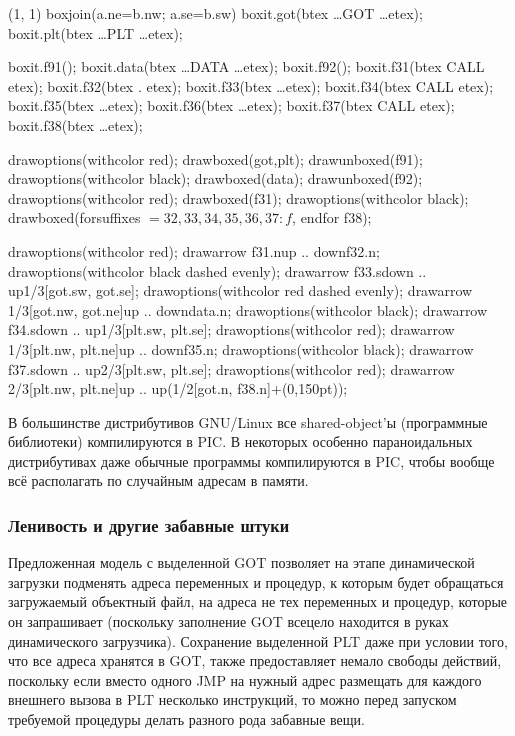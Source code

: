 \begin{empdef}[pic](1, 1)
    boxjoin(a.ne=b.nw; a.se=b.sw)
    boxit.got(btex \dots GOT \dots etex);
    boxit.plt(btex \dots PLT \dots etex);

    boxit.f91();
    boxit.data(btex \dots DATA \dots etex);
    boxit.f92();
    boxit.f31(btex CALL etex);
    boxit.f32(btex . etex);
    boxit.f33(btex \dots etex);
    boxit.f34(btex CALL etex);
    boxit.f35(btex \dots etex);
    boxit.f36(btex \dots etex);
    boxit.f37(btex CALL etex);
    boxit.f38(btex \dots etex);

    drawoptions(withcolor red);
    drawboxed(got,plt);
    drawunboxed(f91);
    drawoptions(withcolor black);
    drawboxed(data);
    drawunboxed(f92);
    drawoptions(withcolor red);
    drawboxed(f31);
    drawoptions(withcolor black);
    drawboxed(forsuffixes $=32,33,34,35,36,37: f$, endfor f38);

    drawoptions(withcolor red);
    drawarrow f31.n{up} .. {down}f32.n;
    drawoptions(withcolor black dashed evenly);
    drawarrow f33.s{down} .. {up}1/3[got.sw, got.se];
    drawoptions(withcolor red dashed evenly);
    drawarrow 1/3[got.nw, got.ne]{up} .. {down}data.n;
    drawoptions(withcolor black);
    drawarrow f34.s{down} .. {up}1/3[plt.sw, plt.se];
    drawoptions(withcolor red);
    drawarrow 1/3[plt.nw, plt.ne]{up} .. {down}f35.n;
    drawoptions(withcolor black);
    drawarrow f37.s{down} .. {up}2/3[plt.sw, plt.se];
    drawoptions(withcolor red);
    drawarrow 2/3[plt.nw, plt.ne]{up} .. {up}(1/2[got.n, f38.n]+(0,150pt));
\end{empdef}


В большинстве дистрибутивов GNU/Linux все shared-object'ы (программные библиотеки) компилируются в PIC.
В некоторых особенно параноидальных дистрибутивах даже обычные программы компилируются в PIC, чтобы вообще всё располагать по случайным адресам в памяти.

\subsubsection{Ленивость и другие забавные штуки}\label{sec:cl:linking:lazy}

Предложенная модель с выделенной GOT позволяет на этапе динамической загрузки подменять адреса переменных и процедур, к которым будет обращаться загружаемый объектный файл, на адреса не тех переменных и процедур, которые он запрашивает (поскольку заполнение GOT всецело находится в руках динамического загрузчика).
Сохранение выделенной PLT даже при условии того, что все адреса хранятся в GOT, также предоставляет немало свободы действий, поскольку если вместо одного JMP на нужный адрес размещать для каждого внешнего вызова в PLT несколько инструкций, то можно перед запуском требуемой процедуры делать разного рода забавные вещи.

